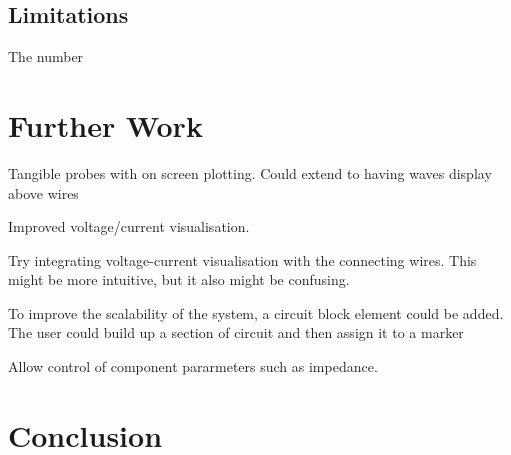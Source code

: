 \subsection{Limitations}


The number 

\section{Further Work}
Tangible probes with on screen plotting. Could extend to having waves display above wires

Improved voltage/current visualisation.

Try integrating voltage-current visualisation with the connecting wires. This might be more intuitive, but it also might be confusing.

To improve the scalability of the system, a circuit block element could be added. The user could build up a section of circuit and then assign it to a marker 

Allow control of component pararmeters such as impedance.

\section{Conclusion}

